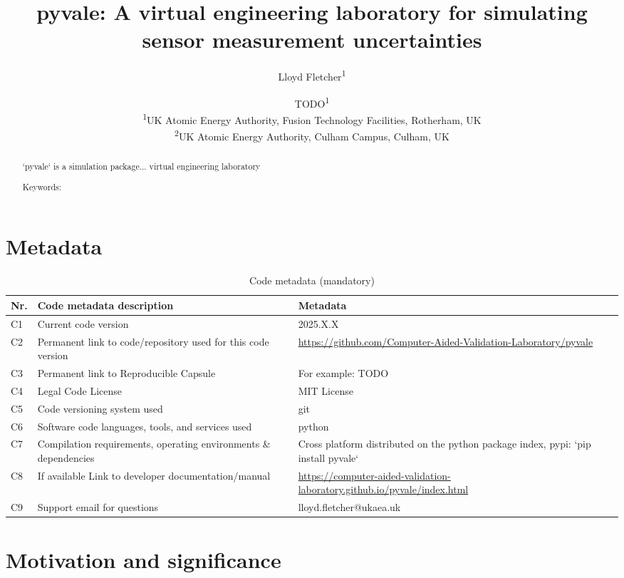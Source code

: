 \documentclass[11pt, a4paper, oneside, onecolumn]{article}
\title{pyvale: A virtual engineering laboratory for simulating sensor measurement uncertainties}
\author{Lloyd Fletcher\textsuperscript{1} \and TODO\textsuperscript{1}\\
\textsuperscript{1}UK Atomic Energy Authority, Fusion Technology Facilities, Rotherham, UK\\
\textsuperscript{2}UK Atomic Energy Authority, Culham Campus, Culham, UK\\
}
\date{}
\begin{document}
\maketitle

\begin{abstract}
`pyvale` is a simulation package... virtual engineering laboratory  


Keywords: 
\end{abstract}

\section*{Metadata}
\label{}
\begin{table}[!h]
\begin{tabular}{|l|p{6.5cm}|p{6.5cm}|}
\hline
\textbf{Nr.} & \textbf{Code metadata description} & \textbf{Metadata} \\
\hline
C1 & Current code version & 2025.X.X \\
\hline
C2 & Permanent link to code/repository used for this code version & \url{https://github.com/Computer-Aided-Validation-Laboratory/pyvale} \\
\hline
C3  & Permanent link to Reproducible Capsule & For example: TODO\\
\hline
C4 & Legal Code License   & MIT License \\
\hline
C5 & Code versioning system used & git \\
\hline
C6 & Software code languages, tools, and services used & python \\
\hline
C7 & Compilation requirements, operating environments \& dependencies & Cross platform distributed on the python package index, pypi: `pip install pyvale` \\
\hline
C8 & If available Link to developer documentation/manual & \url{https://computer-aided-validation-laboratory.github.io/pyvale/index.html} \\
\hline
C9 & Support email for questions & lloyd.fletcher@ukaea.uk \\
\hline
\end{tabular}
\caption{Code metadata (mandatory)}
\label{codeMetadata} 
\end{table}

\section{Motivation and significance}
\end{document}
